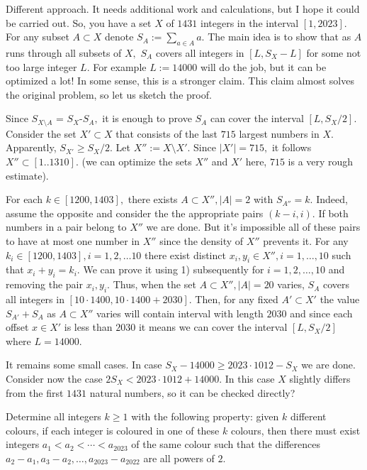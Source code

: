 \documentclass[11pt]{article}
\theoremstyle{definition}
\begin{document}
\begin{solution}[name={Solution by Dragomir Grozev}]
	Different approach. It needs additional work and calculations, but I hope it could be carried out. So, you have a set $X$ of $1431$ integers in the interval $[1,2023]$. For any subset $A\subset X$ denote $S_A:=\sum_{a\in A}a.$
	The main idea is to show that as $A$ runs through all subsets of $X,$ $S_A$ covers all integers in $[L,S_X-L]$ for some not too large integer $L.$ For example $L:=14000$ will do the job, but it can be optimized a lot! In some sense, this is a stronger claim. This claim almost solves the original problem, so let us sketch the proof.
	
	Since $S_{X\setminus A}$ = $S_X$-$S_A,$ it is enough to prove $S_A$ can cover the interval $[L,S_X/2].$ Consider the set $X'\subset X$ that consists of the last $715$ largest numbers in $X.$ Apparently, $S_{X'}\ge S_X/2.$ Let $X'':=X\setminus X'.$ Since $|X'|= 715, $ it follows $X''\subset [1..1310].$ (we can optimize the sets $X''$ and $X'$ here, $715$ is a very rough estimate).
	\begin{tasks}[label=\arabic*]
		\task For each $k\in [1200, 1403],$ there exists $A\subset X'', |A|=2$ with $S_{A''}=k.$ Indeed, assume the opposite and consider the the appropriate pairs $(k-i,i).$ If both numbers in a pair belong to $X''$ we are done. But it's impossible all of these pairs to have at most one number in $X''$ since the density of $X''$ prevents it.
		\task For any $k_i \in [1200, 1403],i=1,2,\dots 10$ there exist distinct $x_i,y_i\in X'',i=1,\dots,10$ such that $x_i+y_i=k_i.$ We can prove it using 1) subsequently for $i=1,2,\dots,10$ and removing the pair $x_i,y_i.$
		\task Thus, when the set $A\subset X'', |A|=20$ varies, $S_A$ covers all integers in $[10\cdot 1400, 10\cdot 1400 + 2030].$ Then, for any fixed $A'\subset X'$ the value $S_{A'}+S_{A}$ as $A\subset X''$ varies will contain interval with length $2030$ and since each offset $x\in X'$ is less than $2030$ it means we can cover the interval $[L,S_X/2]$ where $L=14000$.
	\end{tasks}
	
	It remains some small cases. In case $S_X-14000\ge 2023\cdot 1012 -S_X$ we are done. Consider now the case $2S_X<2023\cdot 1012+14000$. In this case $X$ slightly differs from the first $1431$ natural numbers, so it can be checked directly?
\end{solution}





\begin{question}[name={2023 Benelux, \href{https://artofproblemsolving.com/community/c6h3067009p27675617}{Problem 2}}]
	Determine all integers $k\geqslant 1$ with the following property: given $k$ different colours, if each integer is coloured in one of these $k$ colours, then there must exist integers $a_1<a_2<\cdots<a_{2023}$ of the same colour such that the differences $a_2-a_1,a_3-a_2,\dots,a_{2023}-a_{2022}$ are all powers of $2$.	
\end{question}
\end{document}
